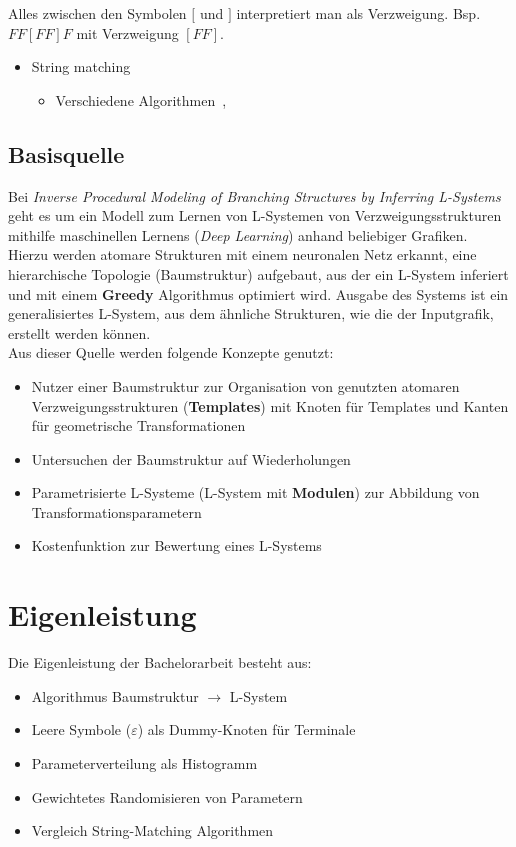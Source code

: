 \documentclass[11pt]{article}
\begin{document}
    \newpage
    Alles zwischen den Symbolen $[$ und $]$ interpretiert man als Verzweigung.
    Bsp. $FF[FF]F$ mit Verzweigung $[FF]$.

    \begin{itemize}
        \item String matching~\cite{6}
        \begin{itemize}
            \item Verschiedene Algorithmen~\cite{7},~\cite{8}
        \end{itemize}
    \end{itemize}

    \subsection{Basisquelle}
    Bei \textit{Inverse Procedural Modeling of Branching Structures by Inferring L-Systems}\cite{2} geht es um ein
    Modell zum Lernen von L-Systemen von Verzweigungsstrukturen mithilfe maschinellen Lernens (\textit{Deep
    Learning}) anhand beliebiger Grafiken.
    Hierzu werden atomare Strukturen mit einem neuronalen Netz erkannt, eine hierarchische Topologie (Baumstruktur)
    aufgebaut, aus der ein L-System inferiert und mit einem \textbf{Greedy} Algorithmus optimiert wird.
    Ausgabe des Systems ist ein generalisiertes L-System, aus dem ähnliche Strukturen, wie die der Inputgrafik,
    erstellt werden können.\\
    Aus dieser Quelle werden folgende Konzepte genutzt:
    \begin{itemize}
        \item Nutzer einer Baumstruktur zur Organisation von genutzten atomaren Verzweigungsstrukturen
        (\textbf{Templates}) mit Knoten für Templates und Kanten für geometrische Transformationen
        \item Untersuchen der Baumstruktur auf Wiederholungen
        \item Parametrisierte L-Systeme (L-System mit \textbf{Modulen}) zur Abbildung von Transformationsparametern
        \item Kostenfunktion zur Bewertung eines L-Systems
    \end{itemize}


    \section{Eigenleistung}
    Die Eigenleistung der Bachelorarbeit besteht aus:
    \begin{itemize}
        \item Algorithmus Baumstruktur $\rightarrow$ L-System
        \item Leere Symbole ($\varepsilon$) als Dummy-Knoten für Terminale
        \item Parameterverteilung als Histogramm
        \item Gewichtetes Randomisieren von Parametern
        \item Vergleich String-Matching Algorithmen
    \end{itemize}
\end{document}
